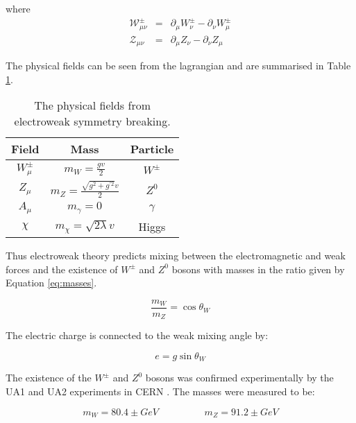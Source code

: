 where
\begin{eqnarray}
\mathcal{W}_{\mu\nu}^{\pm} &=& \partial_{\mu}W_{\nu}^{\pm} -
\partial_{\nu}W_{\mu}^{\pm} \\
\mathcal{Z}_{\mu\nu} &=& \partial_{\mu}Z_{\nu} - \partial_{\nu}Z_{\mu}
\end{eqnarray}

The physical fields can be seen from the lagrangian and are summarised in Table
\ref{tab:physical}. \\

\begin{table}
\begin{center}
\begin{tabular}{|c|c|c|}
\hline
Field & Mass & Particle \\
\hline
$W_{\mu}^{\pm}$ & $m_{W} = \frac{gv}{2}$ & $W^{\pm}$ \\
$Z_{\mu}$ & $m_{Z} = \frac{\sqrt{g^{2} + g^{\prime 2}}v}{2}$ & $Z^{0}$ \\
$A_{\mu}$ & $m_{\gamma} = 0$ & $\gamma$ \\
$\chi$ & $m_{\chi} = \sqrt{2\lambda}v$ & Higgs \\
\hline
\end{tabular}
\end{center}
\caption{The physical fields from electroweak symmetry breaking.}
\label{tab:physical}
\end{table} 

Thus electroweak theory predicts mixing between the electromagnetic and weak 
forces and the existence of $W^{\pm}$ and $Z^{0}$ bosons with masses in the 
ratio given by Equation \ref{eq:masses}. 

\begin{equation}
\frac{m_{W}}{m_{Z}} = \cos\theta_{W}
\label{eq:masses}
\end{equation}

The electric charge is connected to the weak mixing angle by:

\begin{equation}
e = g\sin\theta_{W}
\end{equation}

The existence of the $W^{\pm}$ and $Z^{0}$ bosons was confirmed experimentally 
by the UA1 and UA2 experiments in CERN \cite{ua1}. The masses were measured to 
be:

\begin{equation}
m_{W} = 80.4\pm \unit{GeV} \hspace{2cm} m_{Z} = 91.2\pm \unit{GeV}
\end{equation}

